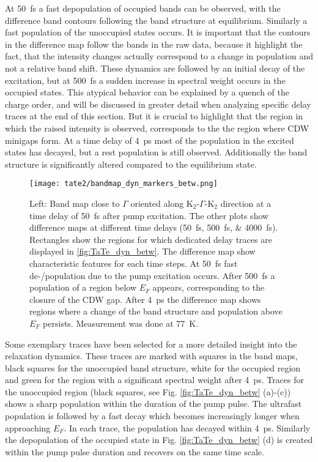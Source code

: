 At \qty{50}{\femto\second} a fast depopulation of occupied bands can be observed, with the difference band contours following the band structure at equilibrium.
Similarly a fast population of the unoccupied states occurs.
It is important that the contours in the difference map follow the bands in the raw data, because it highlight the fact, that the intensity changes actually correspond to a change in population and not a relative band shift.
These dynamics are followed by an initial decay of the excitation, but at \qty{500}{\femto\second} a sudden increase in spectral weight occurs in the occupied states.
This atypical behavior can be explained by a quench of the charge order, and will be discussed in greater detail when analyzing specific delay traces at the end of this section.
But it is crucial to highlight that the region in which the raised intensity is observed, corresponds to the the region where CDW minigaps form.
At a time delay of \qty{4}{\pico\second} most of the population in the excited states has decayed, but a rest population is still observed.
Additionally the band structure is significantly altered compared to the equilibrium state.

\begin{figure}[t!]
	\centering
	\texttt{[image: tate2/bandmap\_dyn\_markers\_betw.png]}
	\caption{Left: Band map close to $\Gamma$ oriented along K$_2$-$\Gamma$-K$_2$ direction at a time delay of \qty{50}{\femto\second} after pump excitation. The other plots show difference maps at different time delays (\qtylist{50;500;4000}{\femto\second}). Rectangles show the regions for which dedicated delay traces are displayed in \ref{fig:TaTe_dyn_betw}. The difference map show characteristic features for each time steps. At \qty{50}{\femto\second} fast de-/population due to the pump excitation occurs. After \qty{500}{\femto\second} a population of a region below $E_F$ appears, corresponding to the closure of the CDW gap. After \qty{4}{\pico\second} the difference map shows regions where a change of the band structure and population above $E_F$ persists. Measurement was done at \qty{77}{\kelvin}.}
	\label{fig:TaTe_bandmap_dyn_betw}
\end{figure}

Some exemplary traces have been selected for a more detailed insight into the relaxation dynamics.
These traces are marked with squares in the band maps, black squares for the unoccupied band structure, white for the occupied region and green for the region with a significant spectral weight after \qty{4}{\pico\second}.
Traces for the unoccupied region (black squares, see Fig. \ref{fig:TaTe_dyn_betw} (a)-(c)) shows a sharp population within the duration of the pump pulse.
The ultrafast population is followed by a fast decay which becomes increasingly longer when approaching $E_F$.
In each trace, the population has decayed within \qty{4}{\pico\second}.
Similarly the depopulation of the occupied state in Fig. \ref{fig:TaTe_dyn_betw} (d) is created within the pump pulse duration and recovers on the same time scale.

